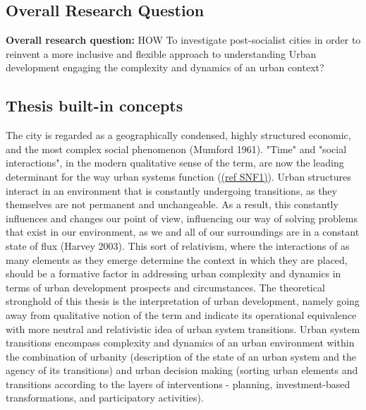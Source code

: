 \documentclass[11pt]{report}
\begin{document}
\subsection{Overall Research Question}

\textbf{Overall research question:} HOW To investigate  post-socialist cities in order to reinvent a more inclusive and flexible approach to understanding Urban development engaging the complexity and dynamics of an urban context? 

\subsection{Thesis built-in concepts}
The city is regarded as a geographically condensed, highly structured economic, and the most complex social phenomenon (Mumford 1961). "Time" and "social interactions", in the modern qualitative sense of the term, are now the leading determinant for the way urban systems function (\href{ref}{(ref SNF1)}). Urban structures interact in an environment that is constantly undergoing transitions, as they themselves are not permanent and unchangeable. As a result, this constantly influences and changes our point of view, influencing our way of solving problems that exist in our environment, as we and all of our surroundings are in a constant state of flux (Harvey 2003). This sort of relativism, where the interactions of as many elements as they emerge determine the context in which they are placed, should be a formative factor in addressing urban complexity and dynamics in terms of urban development prospects and circumstances. The theoretical stronghold of this thesis is the interpretation of urban development, namely going away from qualitative notion of the term and indicate its operational equivalence with more neutral and relativistic idea of urban system transitions. Urban system transitions encompass complexity and dynamics of an urban environment within the combination of urbanity (description of the state of an urban system and the agency of its transitions) and urban decision making (sorting urban elements and transitions according to the layers of interventions - planning, investment-based transformations, and participatory activities).
\\ 
\end{document}
